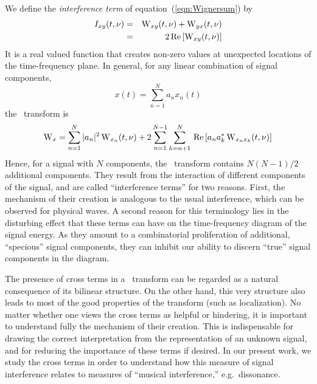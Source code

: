 We define the \emph{interference term} of
equation~(\ref{eqn:Wignersum}) by
\begin{eqnarray*}
  I_{xy}(t,\nu) &=& \operatorname{W}_{xy}(t,\nu) + \operatorname{W}_{yx}(t,\nu) \\
                 &=& 2\,\mbox{Re}\left[\operatorname{W}_{xy}(t,\nu)\right]
\end{eqnarray*}
It is a real valued function that creates non-zero values at
unexpected locations of the time-frequency %
plane. In general, for any linear combination of signal components,
\[
  x(t) = \sum_{n=1}^N a_n x_n(t)
\]
the \WV\ transform is
\begin{equation}\label{eq:WignerSum} 
  \operatorname{W}_{x} = \sum_{n=1}^N|a_n|^2 \operatorname{W}_{x_n}(t,\nu) + 
                 2\sum_{n=1}^{N-1}\sum_{k=n+1}^N\,
                 \mbox{Re}\left[a_n a_k^* \operatorname{W}_{x_nx_k}(t,\nu)\right]
\end{equation}
Hence, for a signal with $N$ components, the \WV\ transform contains 
$N(N-1)/2$
additional components.  They result from the interaction of different
components of the signal, and are called ``interference terms'' for
two reasons.  First, the mechanism of their creation is analogous to
the usual interference, which can be observed for physical waves.  A
second reason for this terminology lies in the disturbing
effect that these terms can have on the %
time-frequency diagram of the signal energy.  As they amount to a
combinatorial proliferation of additional, ``specious'' signal
components, they can inhibit our ability to discern ``true'' signal 
components in the diagram.  

The presence of cross terms in a \WV\ transform can be regarded as a
natural consequence of its bilinear structure.  On the other hand,
this very structure also leads to most of the good properties of the
transform (such as localization).   
No matter whether one views the cross terms as helpful or hindering,
it is important to understand fully the mechanism of their creation.
This is indispensable for drawing the correct interpretation from the 
representation of an unknown signal, and for reducing the importance
of these terms if desired.  In our present work, we study the cross
terms in order to understand how this measure of signal interference
relates to measures of ``musical interference,'' e.g.~dissonance. 


